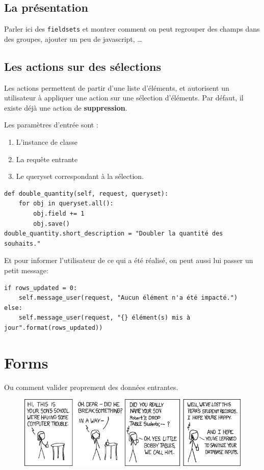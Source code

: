 \documentclass[11pt]{amsbook}
\begin{document}
\hypertarget{x-la-présentation}{\section{La présentation}}
Parler ici des \texttt{fieldsets} et montrer comment on peut regrouper des champs dans des groupes, ajouter un peu de javascript, …​


\hypertarget{x-les-actions-sur-des-sélections}{\section{Les actions sur des sélections}}
Les actions permettent de partir d’une liste d’éléments, et autorisent un utilisateur à appliquer une action sur une sélection d’éléments. Par défaut, il existe déjà une action de \textbf{suppression}.


Les paramètres d’entrée sont :


\begin{enumerate}

\item{L’instance de classe}

\item{La requête entrante}

\item{Le queryset correspondant à la sélection.}

\end{enumerate}


\begin{verbatim}
def double_quantity(self, request, queryset):
	for obj in queryset.all():
		obj.field += 1
		obj.save()
double_quantity.short_description = "Doubler la quantité des souhaits."
\end{verbatim}

Et pour informer l’utilisateur de ce qui a été réalisé, on peut aussi lui passer un petit message:


\begin{verbatim}
if rows_updated = 0:
	self.message_user(request, "Aucun élément n'a été impacté.")
else:
	self.message_user(request, "{} élément(s) mis à jour".format(rows_updated))
\end{verbatim}

\hypertarget{x-forms}{\chapter{Forms}}
Ou comment valider proprement des données entrantes.


\begin{figure}[h]{}
\centering\includegraphics[width=2.5truein]{images/xkcd-327.png}


\end{figure}
\end{document}
